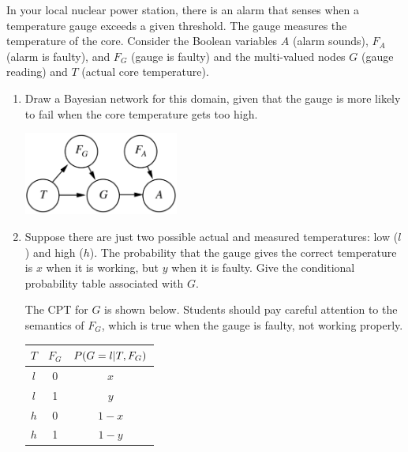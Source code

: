 \documentclass[11pt, a4paper]{article}
\begin{document}
In your local nuclear power station, there is an alarm that senses when a temperature gauge exceeds a given threshold. The gauge measures the temperature of the core. Consider the Boolean variables $A$ (alarm sounds), $F_A$ (alarm is faulty), and $F_G$ (gauge is faulty) and the multi-valued nodes $G$ (gauge reading) and $T$ (actual core temperature).

\begin{enumerate}
    \item Draw a Bayesian network for this domain, given that the gauge is more likely to fail when the core temperature gets too high.
    
    \begin{solution}
        \begin{center}
            \includegraphics[width=0.4\textwidth]{figures/e3_nuclear.png}
        \end{center}
    \end{solution}
    
    \item Suppose there are just two possible actual and measured temperatures: low ($l$) and high ($h$). The probability that the gauge gives the correct temperature is $x$ when it is working, but $y$ when it is faulty. Give the conditional probability table associated with $G$.
    
    \begin{solution}
        The CPT for $G$ is shown below. Students should pay careful attention to the semantics of $F_G$, which is true when the gauge is faulty, \ie{} not working properly.
        \begin{center}
            \begin{tabular}{cc|c}
                \toprule
                 $T$ & $F_G$ & $P(G = l \vert T, F_G)$ \\
                 \midrule
                 $l$ & 0 & $x$ \\
                 $l$ & 1 & $y$ \\
                 $h$ & 0 & $1 - x$ \\
                 $h$ & 1 & $1 - y$ \\
                 \bottomrule
            \end{tabular}
        \end{center}
    \end{solution}
    

\end{enumerate}
\end{document}
